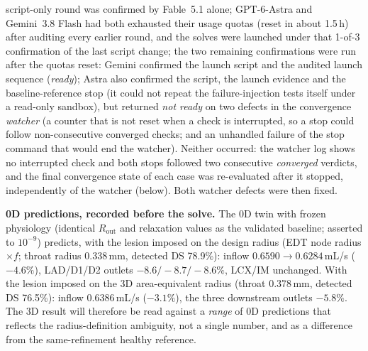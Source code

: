 \documentclass[11pt]{article}
\begin{document}
script-only round was confirmed by Fable~5.1 alone; GPT-6-Astra and Gemini~3.8 Flash had both exhausted their usage quotas (reset in about 1.5\,h) after auditing every earlier round, and the solves were launched under that 1-of-3 confirmation
of the last script change; the two remaining confirmations were run after the quotas reset: Gemini confirmed the launch script and the audited launch sequence (\emph{ready}); Astra also
confirmed the script, the launch evidence and the baseline-reference stop (it could not repeat the failure-injection tests itself under a read-only sandbox), but returned \emph{not ready} on two defects in the convergence \emph{watcher} (a counter that is not reset when a check is
interrupted, so a stop could follow non-consecutive converged checks; and an unhandled failure of the stop command that would end the watcher). Neither occurred: the watcher log shows no interrupted check and both stops followed two consecutive
\emph{converged} verdicts, and the final convergence state of each case was re-evaluated after it stopped, independently of the watcher (below). Both watcher defects were then fixed.

\textbf{0D predictions, recorded before the solve.} The 0D twin with frozen physiology (identical $R_\text{out}$ and relaxation values as the validated baseline; asserted to $10^{-9}$) predicts, with the lesion imposed on the design radius
(EDT node radius$\times f$; throat radius 0.338\,mm, detected DS 78.9\%): inflow $0.6590\to0.6284$\,mL/s ($-4.6\%$), LAD/D1/D2 outlets $-8.6/-8.7/-8.6\%$, LCX/IM unchanged. With the lesion imposed on the 3D area-equivalent radius (throat 0.378\,mm, detected DS 76.5\%): inflow $0.6386$\,mL/s ($-3.1\%$), the three downstream outlets $-5.8\%$.
The 3D result will therefore be read against a \emph{range} of 0D predictions that reflects the radius-definition ambiguity, not a single number, and as a difference from the same-refinement healthy reference.
\end{document}
